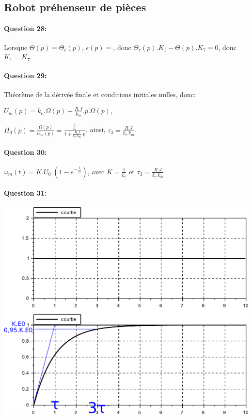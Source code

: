 \subsection{Robot préhenseur de pièces}

\paragraph{Question 28:}

Lorsque $\Theta(p)=\Theta_c(p)$, $\epsilon(p)=$, donc $\Theta_c(p).K_1-\Theta(p).K_7=0$, donc $K_1=K_7$.
\paragraph{Question 29:}

Théorème de la dérivée finale et conditions initiales nulles, donc:

$U_m(p)=k_e.\Omega(p)+\frac{R.J}{k_m}.p.\Omega(p)$,

$H_3(p)=\frac{\Omega(p)}{U_m(p)}=\frac{\frac{1}{k_e}}{1+\frac{R.J}{k_e.k_m}.p}$, ainsi, $\tau_3=\frac{R.J}{k_e.k_m}$.

\paragraph{Question 30:}

$\omega_m(t)=K.U_0.(1-e^{-\frac{t}{\tau_3}})$, avec $K=\frac{1}{k_e}$ et $\tau_3=\frac{R.J}{k_e.k_m}$.

\paragraph{Question 31:}

\begin{center}
	\includegraphics[width=0.8\linewidth]{img/cor31}
\end{center}

